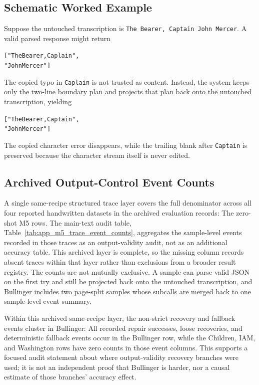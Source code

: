 \subsection{Schematic Worked Example}
\label{sec:appendix_projection_example}

Suppose the untouched transcription is \texttt{The Bearer, Captain John Mercer}. A valid parsed response might return
\begin{alltt}
["The Bearer, Caplain ",
 "John Mercer"]
\end{alltt}
The copied typo in \texttt{Caplain} is not trusted as content. Instead, the system keeps only the two-line boundary plan and projects that plan back onto the untouched transcription, yielding
\begin{alltt}
["The Bearer, Captain ",
 "John Mercer"]
\end{alltt}
The copied character error disappears, while the trailing blank after \texttt{Captain} is preserved because the character stream itself is never edited.

\subsection{Archived Output-Control Event Counts}
\label{sec:appendix_structured_event_coverage}

A single same-recipe structured trace layer covers the full denominator across all four reported handwritten datasets in the archived evaluation records: The zero-shot \GPTFiveShort{} M5 \contextHundred{} rows. The main-text audit table, Table~\ref{tab:app_m5_trace_event_counts}, aggregates the sample-level events recorded in those traces as an output-validity audit, not as an additional accuracy table. This archived layer is complete, so the missing column records absent traces within that layer rather than exclusions from a broader result registry. The counts are not mutually exclusive. A sample can parse valid JSON on the first try and still be projected back onto the untouched transcription, and Bullinger includes two page-split samples whose subcalls are merged back to one sample-level event summary.

Within this archived same-recipe layer, the non-strict recovery and fallback events cluster in Bullinger: All recorded repair successes, loose recoveries, and deterministic fallback events occur in the Bullinger row, while the Children, IAM, and Washington rows have zero counts in those event columns. This supports a focused audit statement about where output-validity recovery branches were used; it is not an independent proof that Bullinger is harder, nor a causal estimate of those branches' accuracy effect.

